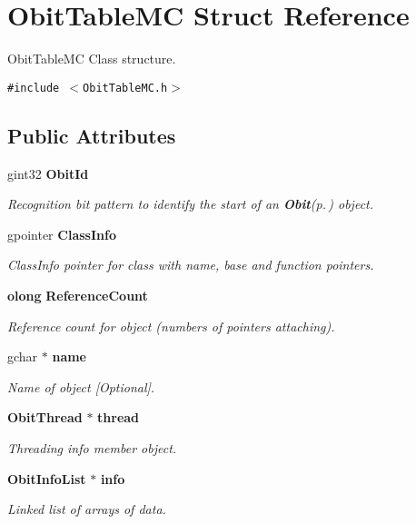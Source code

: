 \section{Obit\-Table\-MC Struct Reference}
\label{structObitTableMC}
Obit\-Table\-MC Class structure.  


{\tt \#include $<$Obit\-Table\-MC.h$>$}

\subsection*{Public Attributes}
\begin{CompactItemize}
\item 
gint32 {\bf Obit\-Id}
\begin{CompactList}\small\item\em Recognition bit pattern to identify the start of an {\bf Obit}{\rm (p.\,\pageref{structObit})} object. \item\end{CompactList}\item 
gpointer {\bf Class\-Info}
\begin{CompactList}\small\item\em Class\-Info pointer for class with name, base and function pointers. \item\end{CompactList}\item 
{\bf olong} {\bf Reference\-Count}
\begin{CompactList}\small\item\em Reference count for object (numbers of pointers attaching). \item\end{CompactList}\item 
gchar $\ast$ {\bf name}
\begin{CompactList}\small\item\em Name of object [Optional]. \item\end{CompactList}\item 
{\bf Obit\-Thread} $\ast$ {\bf thread}
\begin{CompactList}\small\item\em Threading info member object. \item\end{CompactList}\item 
{\bf Obit\-Info\-List} $\ast$ {\bf info}
\begin{CompactList}\small\item\em Linked list of arrays of data. \item\end{CompactList}\item 

\end{CompactItemize}
